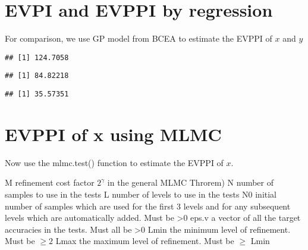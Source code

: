 \documentclass[
]{article}
\newenvironment{Shaded}{\begin{snugshade}}{\end{snugshade}}
\newcommand{\CommentTok}[1]{\textcolor[rgb]{0.56,0.35,0.01}{\textit{#1}}}
\newcommand{\NormalTok}[1]{#1}
\newcommand{\OperatorTok}[1]{\textcolor[rgb]{0.81,0.36,0.00}{\textbf{#1}}}
\begin{document}
\hypertarget{evpi-and-evppi-by-regression}{%
\section{EVPI and EVPPI by
regression}\label{evpi-and-evppi-by-regression}}

For comparison, we use GP model from BCEA to estimate the EVPPI of \(x\)
and \(y\)

\begin{Shaded}
\end{Shaded}

\begin{verbatim}
## [1] 124.7058
\end{verbatim}

\begin{Shaded}
\end{Shaded}

\begin{verbatim}
## [1] 84.82218
\end{verbatim}

\begin{Shaded}
\end{Shaded}

\begin{verbatim}
## [1] 35.57351
\end{verbatim}

\hypertarget{evppi-of-x-using-mlmc}{%
\section{EVPPI of x using MLMC}\label{evppi-of-x-using-mlmc}}

Now use the mlmc.test() function to estimate the EVPPI of \(x\).

M refinement cost factor \(2^{\gamma}\) in the general MLMC Throrem) N
number of samples to use in the tests L number of levels to use in the
tests N0 initial number of samples which are used for the first 3 levels
and for any subsequent levels which are automatically added. Must be
\textgreater0 eps.v a vector of all the target accuracies in the tests.
Must all be \textgreater0 Lmin the minimum level of refinement. Must be
\(\ge 2\) Lmax the maximum level of refinement. Must be \(\ge\) Lmin
\end{document}
